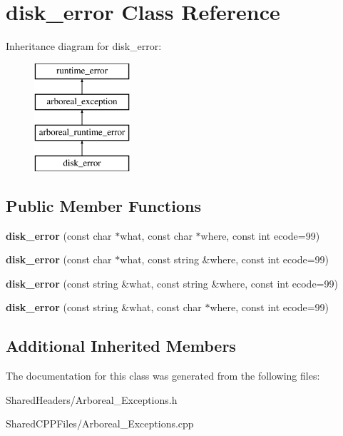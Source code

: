 \hypertarget{classdisk__error}{}\section{disk\+\_\+error Class Reference}
\label{classdisk__error}
Inheritance diagram for disk\+\_\+error\+:\begin{figure}[H]
\begin{center}
\leavevmode
\includegraphics[height=4.000000cm]{d1/d8c/classdisk__error}
\end{center}
\end{figure}
\subsection*{Public Member Functions}
\begin{DoxyCompactItemize}
\item 
\mbox{\label{classdisk__error_a2b3f22e37f13642df676c5eaf10526d3}} 
{\bfseries disk\+\_\+error} (const char $\ast$what, const char $\ast$where, const int ecode=99)
\item 
\mbox{\label{classdisk__error_a0c883fc590a36b64bfb88b403637a89f}} 
{\bfseries disk\+\_\+error} (const char $\ast$what, const string \&where, const int ecode=99)
\item 
\mbox{\label{classdisk__error_af7db4123b6989178ad42e577a94b053e}} 
{\bfseries disk\+\_\+error} (const string \&what, const string \&where, const int ecode=99)
\item 
\mbox{\label{classdisk__error_a0288a245365c28dc6c48e5fd0c8fafd7}} 
{\bfseries disk\+\_\+error} (const string \&what, const char $\ast$where, const int ecode=99)
\end{DoxyCompactItemize}
\subsection*{Additional Inherited Members}


The documentation for this class was generated from the following files\+:\begin{DoxyCompactItemize}
\item 
Shared\+Headers/Arboreal\+\_\+\+Exceptions.\+h\item 
Shared\+C\+P\+P\+Files/Arboreal\+\_\+\+Exceptions.\+cpp\end{DoxyCompactItemize}

